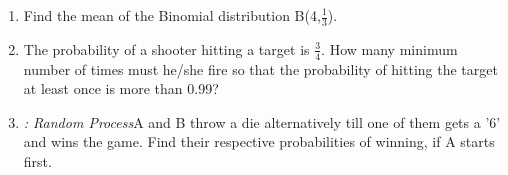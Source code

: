 \begin{enumerate}[label=\arabic*.,ref=\thesubsection.\theenumi]
\item Find the mean of the Binomial distribution B(4,$\frac{1}{3}$).
\\
\solution


\item The probability of a shooter hitting a target is $\frac{3}{4}$. How many minimum
number of times must he/she fire so that the probability of hitting the target at least
once is more than 0.99?
\\
\solution


\item {\em: Random Process}A and B throw a die alternatively till one of them gets a '6' and wins the game. Find their respective probabilities of winning, if A starts first.
\\
\solution



\end{enumerate}
